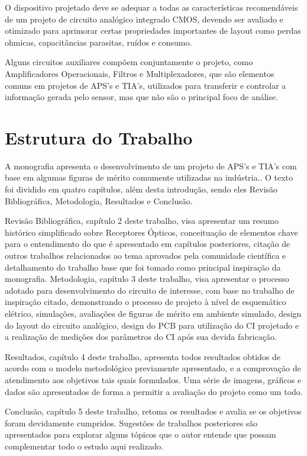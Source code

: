 O dispositivo projetado deve se adequar a todas as características recomendáveis de um projeto de circuito analógico integrado CMOS, devendo ser avaliado e otimizado para aprimorar certas propriedades importantes de layout como perdas ohmicas, capacitâncias parasitas, ruídos e consumo.

Alguns circuitos auxiliares compõem conjuntamente o projeto, como Amplificadores Operacionais, Filtros e Multiplexadores, que são elementos comuns em projetos de APS’s e TIA's, utilizados para transferir e controlar a informação gerada pelo sensor, mas que não são o principal foco de análise.

\section{Estrutura do Trabalho}

A monografia apresenta o desenvolvimento de um projeto de APS's e TIA's com base em algumas figuras de mérito comumente utilizadas na indústria.. O texto foi dividido em quatro capítulos, além desta introdução, sendo eles Revisão Bibliográfica, Metodologia, Resultados e Conclusão.

Revisão Bibliográfica, capítulo 2 deste trabalho, visa apresentar um resumo histórico simplificado sobre Receptores Ópticos, conceituação de elementos chave para o entendimento do que é apresentado em capítulos posteriores, citação de outros trabalhos relacionados ao tema aprovados pela comunidade científica e detalhamento do trabalho base que foi tomado como principal inspiração da monografia.
Metodologia, capítulo 3 deste trabalho, visa apresentar o processo adotado para desenvolvimento do circuito de interesse, com base no trabalho de inspiração citado, demonstrando o processo de projeto à nível de esquemático elétrico, simulações, avaliações de figuras de mérito em ambiente simulado, design do layout do circuito analógico, design do PCB para utilização do CI projetado e a realização de medições dos parâmetros do CI após sua devida fabricação.

Resultados, capítulo 4 deste trabalho, apresenta todos resultados obtidos de acordo com o modelo metodológico previamente apresentado, e a comprovação de atendimento aos objetivos tais quais formulados. Uma série de imagens, gráficos e dados são apresentados de forma a permitir a avaliação do projeto como um todo.

Conclusão, capítulo 5 deste trabalho, retoma os resultados e avalia se os objetivos foram devidamente cumpridos. Sugestões de trabalhos posteriores são apresentados para explorar alguns tópicos que o autor entende que possam complementar todo o estudo aqui realizado.

